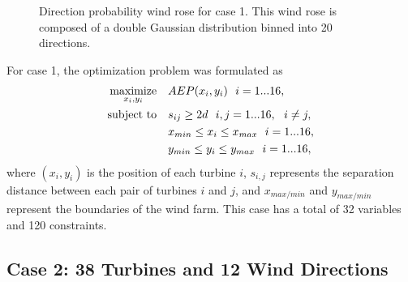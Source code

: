\documentclass[journal abbreviation, manuscript]{copernicus}
\begin{document}
\begin{figure}[h!]
\begin{minipage}[t]{18pc}
			\caption{Direction probability wind rose for case 1. This wind rose is composed of a double Gaussian distribution binned into 20 directions.}
			\label{fig:directional}
		\end{minipage} 
	\end{figure}
	
	For case 1, the optimization problem was formulated as
	\begin{equation}
		\label{eqn:opt1}
		\begin{aligned} [b]
			\underset{x_i,y_i}{\textrm{maximize}} \quad & AEP(x_i,y_i)~~i=1...16,\\
			\textrm{subject to} \quad & s_{ij} \geq 2\*d~~i,j=1...16,~~i \neq j,\\
			& x_{min} \leq x_i \leq x_{max}~~i=1...16,\\
			& y_{min} \leq y_i \leq y_{max}~~i=1...16,
		\end{aligned}
	\end{equation}
	where $(x_i,y_i)$ is the position of each turbine $i$, $s_{i,j}$ represents the separation distance between each pair of turbines $i$ and $j$, and $x_{max/min}$ and $y_{max/min}$ represent the boundaries of the wind farm. This case has a total of 32 variables and 120 constraints.
	
	\subsection{Case 2: 38 Turbines and 12 Wind Directions}\label{sec:case2}
	
\end{document}
